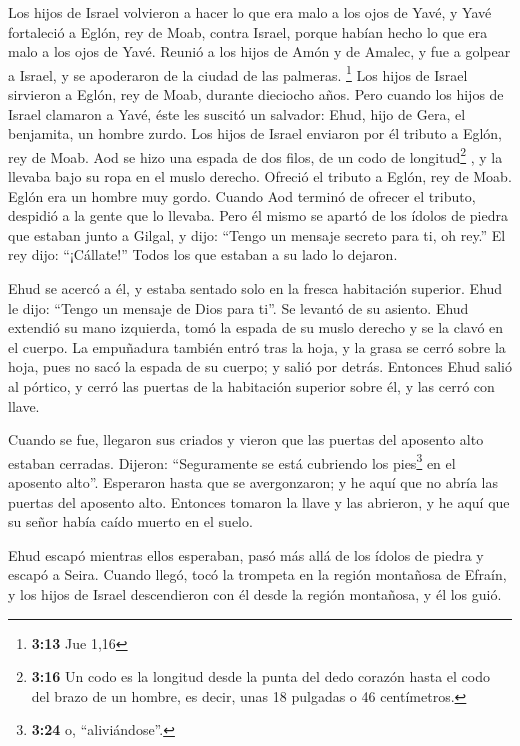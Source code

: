  Los hijos de Israel volvieron a hacer lo que era malo a
los ojos de Yavé, y Yavé fortaleció a Eglón, rey de Moab, contra Israel,
porque habían hecho lo que era malo a los ojos de Yavé. 
Reunió a los hijos de Amón y de Amalec, y fue a golpear a Israel, y se
apoderaron de la ciudad de las palmeras. \footnote{\textbf{3:13} Jue
  1,16}  Los hijos de Israel sirvieron a Eglón, rey de
Moab, durante dieciocho años.  Pero cuando los hijos de
Israel clamaron a Yavé, éste les suscitó un salvador: Ehud, hijo de
Gera, el benjamita, un hombre zurdo. Los hijos de Israel enviaron por él
tributo a Eglón, rey de Moab.  Aod se hizo una espada de
dos filos, de un codo de longitud\footnote{\textbf{3:16} Un codo es la
  longitud desde la punta del dedo corazón hasta el codo del brazo de un
  hombre, es decir, unas 18 pulgadas o 46 centímetros.} , y la llevaba
bajo su ropa en el muslo derecho.  Ofreció el tributo a
Eglón, rey de Moab. Eglón era un hombre muy gordo. 
Cuando Aod terminó de ofrecer el tributo, despidió a la gente que lo
llevaba.  Pero él mismo se apartó de los ídolos de piedra
que estaban junto a Gilgal, y dijo: ``Tengo un mensaje secreto para ti,
oh rey.'' El rey dijo: ``¡Cállate!'' Todos los que estaban a su lado lo
dejaron.

 Ehud se acercó a él, y estaba sentado solo en la fresca
habitación superior. Ehud le dijo: ``Tengo un mensaje de Dios para ti''.
Se levantó de su asiento.  Ehud extendió su mano
izquierda, tomó la espada de su muslo derecho y se la clavó en el
cuerpo.  La empuñadura también entró tras la hoja, y la
grasa se cerró sobre la hoja, pues no sacó la espada de su cuerpo; y
salió por detrás.  Entonces Ehud salió al pórtico, y
cerró las puertas de la habitación superior sobre él, y las cerró con
llave.

 Cuando se fue, llegaron sus criados y vieron que las
puertas del aposento alto estaban cerradas. Dijeron: ``Seguramente se
está cubriendo los pies\footnote{\textbf{3:24} o, ``aliviándose''.} en
el aposento alto''.  Esperaron hasta que se avergonzaron;
y he aquí que no abría las puertas del aposento alto. Entonces tomaron
la llave y las abrieron, y he aquí que su señor había caído muerto en el
suelo.

 Ehud escapó mientras ellos esperaban, pasó más allá de
los ídolos de piedra y escapó a Seira.  Cuando llegó,
tocó la trompeta en la región montañosa de Efraín, y los hijos de Israel
descendieron con él desde la región montañosa, y él los guió.

